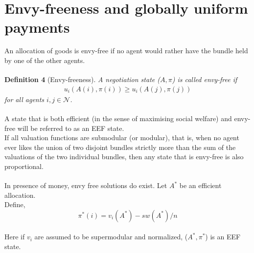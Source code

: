 \documentclass{article}
\begin{document}
\section{Envy-freeness and globally uniform payments}
An allocation of goods is envy-free if no agent would rather have the bundle held by one of the other agents.\\
\\
\textbf{Definition 4} (Envy-freeness). \textit{A negotiation state ($A, \pi$) is called envy-free if 
\begin{align*}
    u_{i}(A(i), \pi(i)) \geq u_{i}(A(j), \pi(j))
\end{align*}
for all agents $i, j \in \mathcal{N}$.}\\
\\
A state that is both efficient (in the sense of maximising social welfare) and envy-free will be referred to
as an EEF state.\\
If all valuation functions are submodular (or modular), that is, when no agent ever likes the union of
two disjoint bundles strictly more than the sum of the valuations of the two individual bundles, then any
state that is envy-free is also proportional.\\
\\
In presence of money, envy free solutions do exist. Let $A^{*}$ be an efficient allocation.\\
Define,
$$\pi^{*}(i) = v_{i}(A^{*}) - sw(A^{*})/n$$\\
Here if $v_{i}$ are assumed to be supermodular and normalized, ($A^{*},\pi^{*}$) is an EEF state.\\
\\
\end{document}
